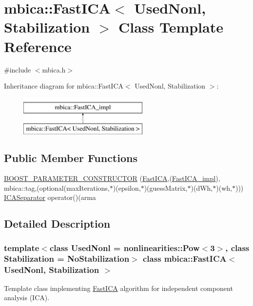 \hypertarget{classmbica_1_1_fast_i_c_a}{
\section{mbica::FastICA$<$ UsedNonl, Stabilization $>$ Class Template Reference}
\label{classmbica_1_1_fast_i_c_a}
}


{\ttfamily \#include $<$mbica.h$>$}

Inheritance diagram for mbica::FastICA$<$ UsedNonl, Stabilization $>$:\begin{figure}[H]
\begin{center}
\leavevmode
\includegraphics[height=2.000000cm]{classmbica_1_1_fast_i_c_a}
\end{center}
\end{figure}
\subsection*{Public Member Functions}
\begin{DoxyCompactItemize}
\item 
\hyperlink{classmbica_1_1_fast_i_c_a_a0ebfbda8cc36464cd851ae41c29e2ece}{BOOST\_\-PARAMETER\_\-CONSTRUCTOR} (\hyperlink{classmbica_1_1_fast_i_c_a}{FastICA},(\hyperlink{classmbica_1_1_fast_i_c_a__impl}{FastICA\_\-impl}), mbica::tag,(optional(maxIterations,$\ast$)(epsilon,$\ast$)(guessMatrix,$\ast$)(dWh,$\ast$)(wh,$\ast$))) \hyperlink{classmbica_1_1_i_c_a_separator}{ICASeparator} operator()(arma
\end{DoxyCompactItemize}


\subsection{Detailed Description}
\subsubsection*{template$<$class UsedNonl = nonlinearities::Pow$<$3$>$, class Stabilization = NoStabilization$>$ class mbica::FastICA$<$ UsedNonl, Stabilization $>$}

Template class implementing \hyperlink{classmbica_1_1_fast_i_c_a}{FastICA} algorithm for independent component analysis (ICA).


